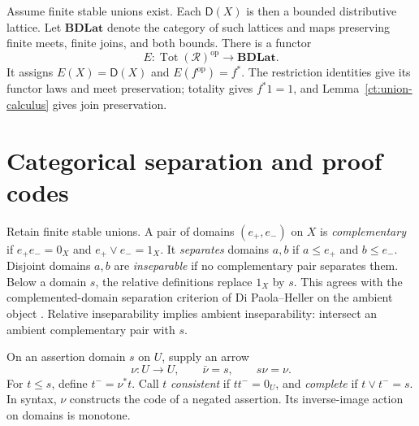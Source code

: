 \documentclass[11pt]{article}
\theoremstyle{definition}
\theoremstyle{remark}
\newcommand{\R}{\mathscr R}
\newcommand{\D}{\mathsf D}
\newcommand{\Tot}{\operatorname{Tot}}
\newcommand{\op}{\mathrm{op}}
\newcommand{\BDLat}{\mathbf{BDLat}}
\begin{document}
Assume finite stable unions exist. Each $\D(X)$ is then a bounded
distributive lattice. Let $\BDLat$ denote the category of such lattices
and maps preserving finite meets, finite joins, and both bounds. There is
a functor
\[
 E:\Tot(\R)^{\op}\longrightarrow\BDLat.
\]
It assigns $E(X)=\D(X)$ and $E(f^{\op})=f^*$. The restriction identities
give its functor laws and meet preservation; totality gives $f^*1=1$,
and Lemma~\ref{ct:union-calculus} gives join preservation.


\section{Categorical separation and proof codes}\label{ct:transfer-section}

Retain finite stable unions. A pair of domains $(e_+,e_-)$ on $X$ is
\emph{complementary} if $e_+e_-=0_X$ and $e_+\vee e_-=1_X$.
It \emph{separates} domains $a,b$ if $a\le e_+$ and $b\le e_-$.
Disjoint domains $a,b$ are \emph{inseparable} if no complementary pair
separates them. Below a domain $s$, the relative definitions replace
$1_X$ by $s$. This agrees with the complemented-domain separation
criterion of Di Paola--Heller on the ambient object
\cite[Definition 8.14]{DPH}. Relative inseparability implies ambient
inseparability: intersect an ambient complementary pair with $s$.

On an assertion domain $s$ on $U$, supply an arrow
\[
 \nu:U\to U,\qquad \bar\nu=s,\qquad s\nu=\nu.
\]
For $t\le s$, define $t^-=\nu^*t$. Call $t$ \emph{consistent} if
$tt^-=0_U$, and \emph{complete} if $t\vee t^-=s$.
In syntax, $\nu$ constructs the code of a negated assertion. Its
inverse-image action on domains is monotone.
\end{document}
